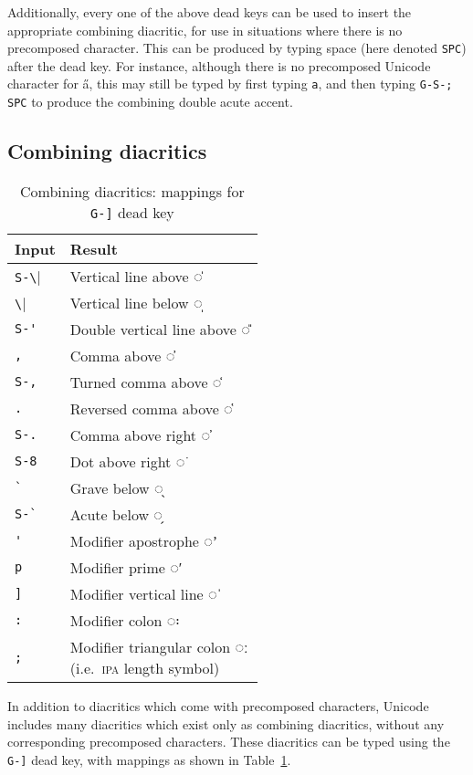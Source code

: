 \documentclass[oneside]{memoir}
\newcommand{\key}{\verb}
\newcommand{\out}[1]{\colorbox{gray!20}{#1}}
\begin{document}
Additionally, every one of the above dead keys can be used to insert the appropriate combining diacritic,
  for use in situations where there is no precomposed character.
This can be produced by typing space (here denoted \key|SPC|) after the dead key.
For instance, although there is no precomposed Unicode character for \out{a̋},
  this may still be typed by first typing \key|a|, and then typing \key|G-S-; SPC| to produce the combining double acute accent.


\subsection{Combining diacritics}
\label{sec:combining_diacritics}

\begin{table}
\centering
\cprotect\caption{Combining diacritics: mappings for \key|G-]| dead key}
\label{tab:misc_diacritics_mappings}
\begin{tabular}{ll}
\toprule
Input & Result \\
\midrule
\key|S-\| & Vertical line above ◌̍ \\
\key|\|   & Vertical line below ◌̩ \\
\key|S-'| & Double vertical line above ◌̎ \\
\key|,|   & Comma above ◌̓ \\
\key|S-,| & Turned comma above ◌̒ \\
\key|.|   & Reversed comma above  ◌̔ \\
\key|S-.| & Comma above right ◌̕ \\
\key|S-8| & Dot above right ◌͘ \\
\key|`|   & Grave below ◌̖ \\
\key|S-`| & Acute below ◌̗ \\
\midrule
\key|'| & Modifier apostrophe ◌ʼ \\
\key|p| & Modifier prime ◌ʹ \\
\key|]| & Modifier vertical line ◌ˈ \\
\key|:| & Modifier colon ◌꞉ \\
\key|;| & \makecell{Modifier triangular colon ◌ː\\(i.e.\ \textsc{ipa} length symbol)} \\
\bottomrule
\end{tabular}
\end{table}

In addition to diacritics which come with precomposed characters, Unicode includes many diacritics which exist only as combining diacritics,
  without any corresponding precomposed characters.
These diacritics can be typed using the \key|G-]| dead key, with mappings as shown in Table~\ref{tab:misc_diacritics_mappings}.
\end{document}
